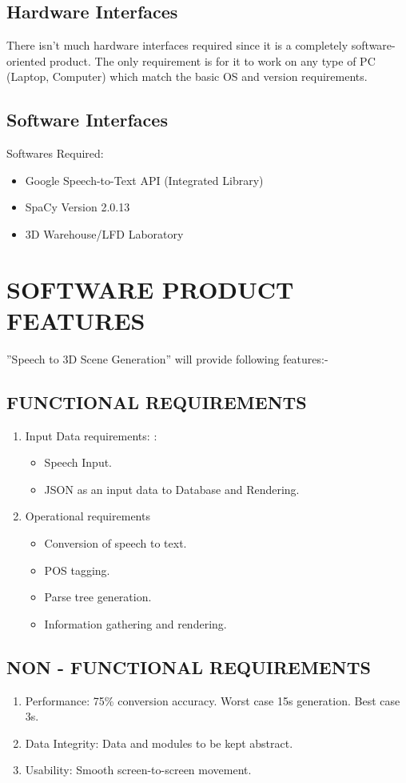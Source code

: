 \documentclass[12pt,a4paper,final,oneside]{report}
\begin{document}
\subsection{Hardware Interfaces}
There isn’t much hardware interfaces required since it is a completely software-oriented product. The only requirement is for it to work on any type of PC (Laptop, Computer) which match the basic OS and version requirements.

\subsection{Software Interfaces}
Softwares Required:
\begin{itemize}
  \item Google Speech-to-Text API (Integrated Library)
  \item SpaCy Version 2.0.13
  \item 3D Warehouse/LFD Laboratory
\end{itemize}

\section{SOFTWARE PRODUCT FEATURES}
''Speech to 3D Scene Generation'' will provide following features:-\newline
\subsection{FUNCTIONAL REQUIREMENTS}
\begin{enumerate}
  \item Input Data requirements: :
\begin{itemize}
\item Speech Input.
\item JSON as an input data to Database and Rendering.
\end{itemize}
\item Operational requirements
\begin{itemize}
\item Conversion of speech to text.
\item POS tagging.
\item Parse tree generation.
\item Information gathering and rendering.
\end{itemize}
\end{enumerate}
\subsection{NON - FUNCTIONAL REQUIREMENTS}
\begin{enumerate}
  \item Performance: 75\% conversion accuracy. Worst case 15s generation. Best case 3s.
 \item Data Integrity: Data and modules to be kept abstract.
 \item Usability: Smooth screen-to-screen movement.

\end{enumerate}
\end{document}
